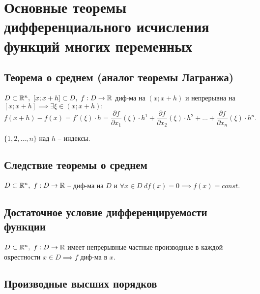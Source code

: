 \section{Основные теоремы дифференциального исчисления функций многих переменных}

\setcounter{subsection}{4}

\subsection{Теорема о среднем (аналог теоремы Лагранжа)}

\begin{theorem}
    $ D \subset \mathbb{R}^n, \ [x;x+h]\subset D, \ f: D \rightarrow\mathbb{R} $ диф-ма на $ (x;x+h) $ и непрерывна на $ [x;x+h] \implies \exists \xi \in (x;x+h): $
    \[
        f(x+h)-f(x) = f'(\xi)\cdot h = \frac{\partial f}{\partial x_1}(\xi)\cdot h^1 + \frac{\partial f}{\partial x_2}(\xi)\cdot h^2 + \ldots + \frac{\partial f}{\partial x_n}(\xi)\cdot h^n.
    \]
\end{theorem}

\begin{note}
    $ \{1,2,\ldots,n\} $ над $ h $ -- индексы.
\end{note}

\subsection{Следствие теоремы о среднем}

\begin{corollary}
    $ D \subset \mathbb{R}^n, \ f:D \rightarrow \mathbb{R} $ -- диф-ма на $ D $ и $ \forall x \in D \ df(x) = 0 \implies f(x) = const $.
\end{corollary}

\subsection{Достаточное условие дифференцируемости функции}

\begin{theorem}
    $ D \subset \mathbb{R}^n, \ f:D \rightarrow\mathbb{R} $ имеет непрерывные частные производные в каждой окрестности $ x \in D \implies f $ диф-ма в $ x $.
\end{theorem}

\subsection{Производные высших порядков}

